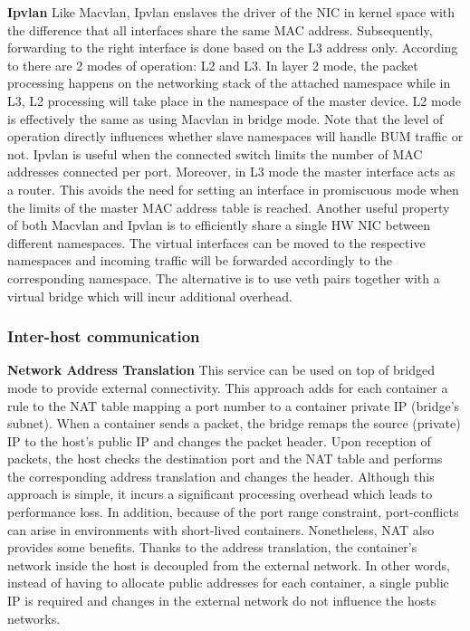 \documentclass[conference]{IEEEtran}
\begin{document}
\noindent\textbf{Ipvlan}\hspace{0.2cm}
Like Macvlan, Ipvlan enslaves the driver of the NIC in kernel space with the difference that all interfaces share the same MAC address. Subsequently, forwarding to the right interface is done based on the L3 address only. According to \cite{ipvlan} there are 2 modes of operation: L2 and L3. In layer 2 mode, the packet processing happens on the networking stack of the attached namespace while in L3, L2 processing will take place in the namespace of the master device. L2 mode is effectively the same as using Macvlan in bridge mode. Note that the level of operation directly influences whether slave namespaces will handle BUM traffic or not. 
Ipvlan is useful when the connected switch limits the number of MAC addresses connected per port. Moreover, in L3 mode the master interface acts as a router. This avoids the need for setting an interface in promiscuous mode when the limits of the master MAC address table is reached. 
Another useful property of both Macvlan and Ipvlan is to efficiently share a single HW NIC between different namespaces. The virtual interfaces can be moved to the respective namespaces and incoming traffic will be forwarded accordingly to the corresponding namespace. The alternative is to use veth pairs together with a virtual bridge which will incur additional overhead. 


\subsubsection{Inter-host communication}\hfill\break
\textbf{Network Address Translation}\hspace{0.2cm} This service can be used on top of bridged mode to provide external connectivity. This approach adds for each container a rule to the NAT table mapping a port number to a container private IP (bridge's subnet). When a container sends a packet, the bridge remaps the source (private) IP to the host's public IP and changes the packet header. Upon reception of packets, the host checks the destination port and the NAT table and performs the corresponding address translation and changes the header. Although this approach is simple, it incurs a significant processing overhead which leads to performance loss. In addition, because of the port range constraint, port-conflicts can arise in environments with short-lived containers. Nonetheless, NAT also provides some benefits. Thanks to the address translation, the container's network inside the host is decoupled from the external network. In other words, instead of having to allocate public addresses for each container, a single public IP is required and changes in the external network do not influence the hosts networks.
\end{document}
